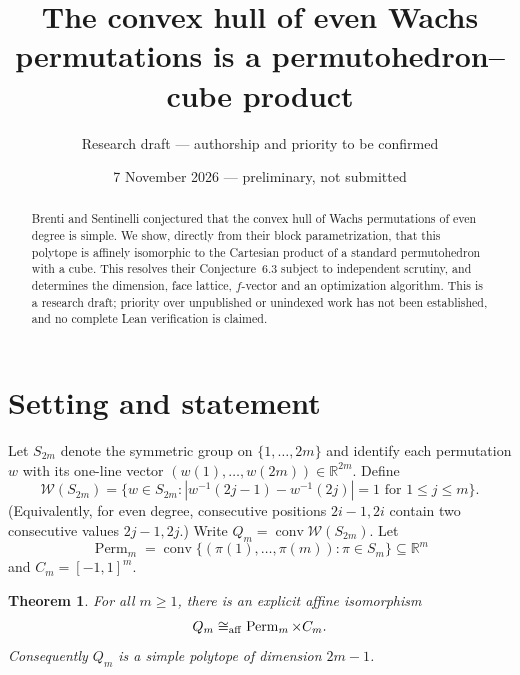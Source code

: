 \documentclass[11pt]{article}
\title{The convex hull of even Wachs permutations is a permutohedron--cube product}
\author{Research draft --- authorship and priority to be confirmed}
\date{7 November 2026 --- preliminary, not submitted}
\newtheorem{theorem}{Theorem}
\newcommand{\W}{\mathcal W}
\newcommand{\conv}{\operatorname{conv}}
\newcommand{\Perm}{\operatorname{Perm}}
\begin{document}
\maketitle
\begin{abstract}
Brenti and Sentinelli conjectured that the convex hull of Wachs permutations of even degree is simple. We show, directly from their block parametrization, that this polytope is affinely isomorphic to the Cartesian product of a standard permutohedron with a cube. This resolves their Conjecture~6.3 subject to independent scrutiny, and determines the dimension, face lattice, $f$-vector and an optimization algorithm. This is a research draft; priority over unpublished or unindexed work has not been established, and no complete Lean verification is claimed.
\end{abstract}

\section{Setting and statement}
Let $S_{2m}$ denote the symmetric group on $\{1,\ldots,2m\}$ and identify each permutation $w$ with its one-line vector $(w(1),\ldots,w(2m))\in\mathbb R^{2m}$. Define
\[
\W(S_{2m})=\{w\in S_{2m}: |w^{-1}(2j-1)-w^{-1}(2j)|=1\text{ for }1\le j\le m\}.
\]
(Equivalently, for even degree, consecutive positions $2i-1,2i$ contain two consecutive values $2j-1,2j$.) Write $Q_m=\conv\W(S_{2m})$. Let
\[\Perm_m=\conv\{(\pi(1),\ldots,\pi(m)):\pi\in S_m\}\subseteq\mathbb R^m\]
and $C_m=[-1,1]^m$.

\begin{theorem}\label{thm:product}
For all $m\ge1$, there is an explicit affine isomorphism
\[Q_m\cong_{\rm aff}\Perm_m\times C_m.\]
Consequently $Q_m$ is a simple polytope of dimension $2m-1$.
\end{theorem}
\end{document}
